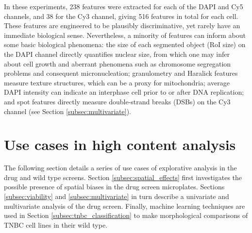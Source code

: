 %

In these experiments, 238 features were extracted for each of the DAPI and Cy5 channels, and 38 for the Cy3 channel, giving 516 features in total for each cell. These features are engineered to be plausibly discriminative, yet rarely have an immediate biological sense. Nevertheless, a minority of features can inform about some basic biological phenomena: the size of each segmented object (RoI size) on the DAPI channel directly quantifies nuclear size, from which one may infer about cell growth and aberrant phenomena such as chromosome segregation problems and consequent micronucleation; granulometry and Haralick features measure texture structures, which can be a proxy for mitochondria; average DAPI intensity can indicate an interphase cell prior to or after DNA replication; and spot features directly measure double-strand breaks (DSBs) on the Cy3 channel (see Section \ref{subsec:multivariate}).

\section{Use cases in high content analysis}
\label{sec:use_cases}

The following section details a series of use cases of explorative analysis in the drug and wild type screens. Section \ref{subsec:spatial_effects} first investigates the possible presence of spatial biases in the drug screen microplates. Sections \ref{subsec:viability} and \ref{subsec:multivariate} in turn describe a univariate and multivariate analysis of the drug screen. Finally, machine learning techniques are used in Section \ref{subsec:tnbc_classification} to make morphological comparisons of TNBC cell lines in their wild type.

